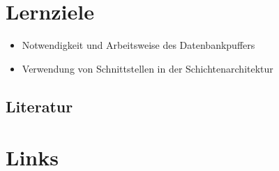\section*{Lernziele}
\begin{itemize}
	\item Notwendigkeit und Arbeitsweise des Datenbankpuffers
	\item Verwendung von Schnittstellen in der Schichtenarchitektur
\end{itemize}

\begin{normalText}
\section*{Literatur}


\end{normalText}

\section*{Links}
\begin{description}
	\ViseAuD
\end{description}
